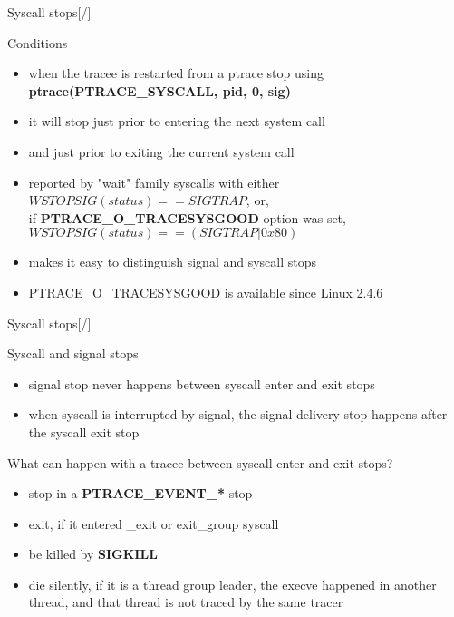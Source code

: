 \documentclass[unicode,aspectratio=169,xcolor={table,dvipsnames,usernames}]{beamer}
\begin{document}
\begin{frame}{\Large Syscall stops\hfill [\insertframenumber/\inserttotalframenumber]}
\Large
\begin{block}{Conditions}
\begin{itemize}
	\item when the tracee is restarted from a ptrace stop using \\
		\textbf{ptrace(PTRACE\_SYSCALL, pid, 0, sig)}
	\item it will stop just prior to entering the next system call
	\item and just prior to exiting the current system call
	\item reported by "wait" family syscalls with either \\
		$WSTOPSIG(status) == SIGTRAP$, or, \\
		if \textbf{PTRACE\_O\_TRACESYSGOOD} option was set, \\
		$WSTOPSIG(status) == (SIGTRAP | 0x80)$
	\item makes it easy to distinguish signal and syscall stops
	\item PTRACE\_O\_TRACESYSGOOD is available since Linux 2.4.6
\end{itemize}
\end{block}
\end{frame}

\begin{frame}{\Large Syscall stops\hfill [\insertframenumber/\inserttotalframenumber]}
\Large
\begin{block}{Syscall and signal stops}
\begin{itemize}
	\item signal stop never happens between syscall enter and exit stops
	\item when syscall is interrupted by signal, the signal delivery stop happens after the syscall exit stop
\end{itemize}
\end{block}

\begin{block}{What can happen with a tracee between syscall enter and exit stops?}
\begin{itemize}
	\item stop in a \textbf{PTRACE\_EVENT\_*} stop
	\item exit, if it entered \_exit or exit\_group syscall
	\item be killed by \textbf{SIGKILL}
	\item die silently, if it is a thread group leader, the execve happened
		in another thread, and that thread is not traced by the same tracer
\end{itemize}
\end{block}
\end{frame}
\end{document}
